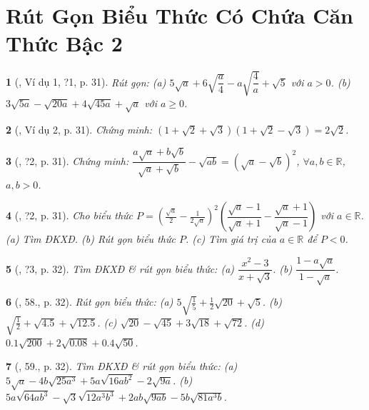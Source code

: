 \documentclass{article}
\newtheorem{baitoan}{}%
\begin{document}

\section{Rút Gọn Biểu Thức Có Chứa Căn Thức Bậc 2}

\begin{baitoan}[\cite{SGK_Toan_9_tap_1}, Ví dụ 1, ?1, p. 31]
	Rút gọn: (a) $5\sqrt{a} + 6\sqrt{\dfrac{a}{4}} - a\sqrt{\dfrac{4}{a}} + \sqrt{5}$ với $a > 0$. (b) $3\sqrt{5a} - \sqrt{20a} + 4\sqrt{45a} + \sqrt{a}$ với $a\ge0$.
\end{baitoan}

\begin{baitoan}[\cite{SGK_Toan_9_tap_1}, Ví dụ 2, p. 31]
	Chứng minh: $(1 + \sqrt{2} + \sqrt{3})(1 + \sqrt{2} - \sqrt{3}) = 2\sqrt{2}$.
\end{baitoan}

\begin{baitoan}[\cite{SGK_Toan_9_tap_1}, ?2, p. 31]
	Chứng minh: $\dfrac{a\sqrt{a} + b\sqrt{b}}{\sqrt{a} + \sqrt{b}} - \sqrt{ab} = (\sqrt{a} - \sqrt{b})^2$, $\forall a,b\in\mathbb{R}$, $a,b > 0$.
\end{baitoan}

\begin{baitoan}[\cite{SGK_Toan_9_tap_1}, ?2, p. 31]
	Cho biểu thức $P = \left(\frac{\sqrt{a}}{2} - \frac{1}{2\sqrt{a}}\right)^2\left(\dfrac{\sqrt{a} - 1}{\sqrt{a} + 1} - \dfrac{\sqrt{a} + 1}{\sqrt{a} - 1}\right)$ với $a\in\mathbb{R}$. (a) Tìm ĐKXĐ. (b) Rút gọn biểu thức $P$. (c) Tìm giá trị của $a\in\mathbb{R}$ để $P < 0$.
\end{baitoan}

\begin{baitoan}[\cite{SGK_Toan_9_tap_1}, ?3, p. 32]
	Tìm ĐKXĐ \& rút gọn biểu thức: (a) $\dfrac{x^2 - 3}{x + \sqrt{3}}$. (b) $\dfrac{1 - a\sqrt{a}}{1 - \sqrt{a}}$.
\end{baitoan}

\begin{baitoan}[\cite{SGK_Toan_9_tap_1}, 58., p. 32]
	Rút gọn biểu thức: (a) $5\sqrt{\frac{1}{5}} + \frac{1}{2}\sqrt{20} + \sqrt{5}$. (b) $\sqrt{\frac{1}{2}} + \sqrt{4.5} + \sqrt{12.5}$. (c) $\sqrt{20} - \sqrt{45} + 3\sqrt{18} + \sqrt{72}$. (d) $0.1\sqrt{200} + 2\sqrt{0.08} + 0.4\sqrt{50}$.
\end{baitoan}

\begin{baitoan}[\cite{SGK_Toan_9_tap_1}, 59., p. 32]
	Tìm ĐKXĐ \& rút gọn biểu thức: (a) $5\sqrt{a} - 4b\sqrt{25a^3} + 5a\sqrt{16ab^2} - 2\sqrt{9a}$. (b) $5a\sqrt{64ab^3} - \sqrt{3}\sqrt{12a^3b^3} + 2ab\sqrt{9ab} - 5b\sqrt{81a^3b}$.
\end{baitoan}
\end{document}

